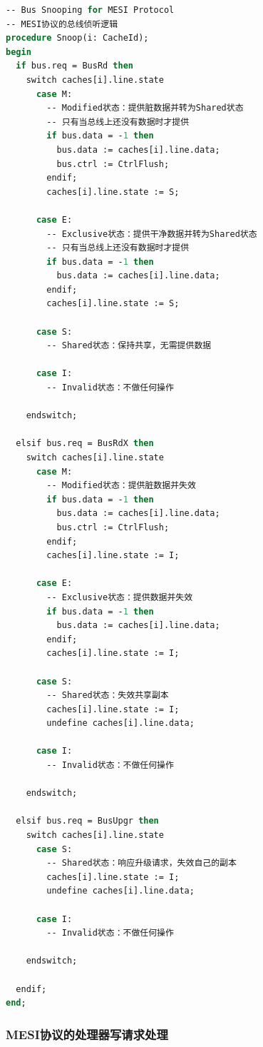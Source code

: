 \documentclass[a4paper]{article}
\begin{document}
\begin{lstlisting}[language=pascal]
-- Bus Snooping for MESI Protocol
-- MESI协议的总线侦听逻辑
procedure Snoop(i: CacheId);
begin
  if bus.req = BusRd then
    switch caches[i].line.state
      case M:
        -- Modified状态：提供脏数据并转为Shared状态
        -- 只有当总线上还没有数据时才提供
        if bus.data = -1 then
          bus.data := caches[i].line.data;
          bus.ctrl := CtrlFlush;
        endif;
        caches[i].line.state := S;

      case E:
        -- Exclusive状态：提供干净数据并转为Shared状态
        -- 只有当总线上还没有数据时才提供
        if bus.data = -1 then
          bus.data := caches[i].line.data;
        endif;
        caches[i].line.state := S;

      case S:
        -- Shared状态：保持共享，无需提供数据

      case I:
        -- Invalid状态：不做任何操作

    endswitch;

  elsif bus.req = BusRdX then
    switch caches[i].line.state
      case M:
        -- Modified状态：提供脏数据并失效
        if bus.data = -1 then
          bus.data := caches[i].line.data;
          bus.ctrl := CtrlFlush;
        endif;
        caches[i].line.state := I;

      case E:
        -- Exclusive状态：提供数据并失效
        if bus.data = -1 then
          bus.data := caches[i].line.data;
        endif;
        caches[i].line.state := I;

      case S:
        -- Shared状态：失效共享副本
        caches[i].line.state := I;
        undefine caches[i].line.data;

      case I:
        -- Invalid状态：不做任何操作

    endswitch;

  elsif bus.req = BusUpgr then
    switch caches[i].line.state
      case S:
        -- Shared状态：响应升级请求，失效自己的副本
        caches[i].line.state := I;
        undefine caches[i].line.data;

      case I:
        -- Invalid状态：不做任何操作

    endswitch;

  endif;
end;
\end{lstlisting}

\subsubsection{MESI协议的处理器写请求处理}
\end{document}
